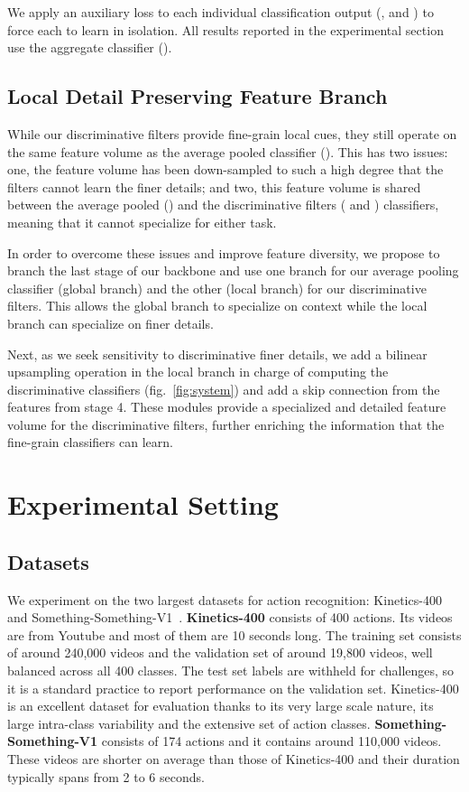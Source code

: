 \documentclass[10pt,twocolumn,letterpaper]{article}
\begin{document}
\vspace{5mm}
We apply an auxiliary loss to each individual classification output (,  and ) to force each to learn in isolation. All results reported in the experimental section use the aggregate classifier ().

\subsection{Local Detail Preserving Feature Branch}
\label{sec:up}

While our discriminative filters provide fine-grain local cues, they still operate on the same feature volume as the average pooled classifier (). This has two issues: one, the feature volume has been down-sampled to such a high degree that the filters cannot learn the finer details; and two, this feature volume is shared between the average pooled () and the discriminative filters ( and ) classifiers, meaning that it cannot specialize for either task.




In order to overcome these issues and improve feature diversity, we propose to branch the last stage of our backbone and use one branch for our average pooling classifier (global branch) and the other (local branch) for our discriminative filters. This allows the global branch to specialize on context while the local branch can specialize on finer details. 

Next, as we seek sensitivity to discriminative finer details, we add a bilinear upsampling operation in the local branch in charge of computing the discriminative classifiers (fig.~\ref{fig:system}) and add a skip connection from the features from stage 4. These modules provide a specialized and detailed feature volume for the discriminative filters, further enriching the information that the fine-grain classifiers can learn.


\section{Experimental Setting}
\label{sec:exp_setting}
\subsection{Datasets}
\label{sec:datasets}

We experiment on the two largest datasets for action recognition: Kinetics-400~\cite{Kinetics} and Something-Something-V1~\cite{Something_Something_ICCV17}. {\bf Kinetics-400} consists of 400 actions. Its videos are from Youtube and most of them are 10 seconds long. The training set consists of around 240,000 videos and the validation set of around 19,800 videos, well balanced across all 400 classes. The test set labels are withheld for challenges, so it is a standard practice to report performance on the validation set. Kinetics-400 is an excellent dataset for evaluation thanks to its very large scale nature, its large intra-class variability and the extensive set of action classes. 
{\bf Something-Something-V1} consists of 174 actions and it contains around 110,000 videos. These videos are shorter on average than those of Kinetics-400 and their duration typically spans from 2 to 6 seconds. 
\end{document}
